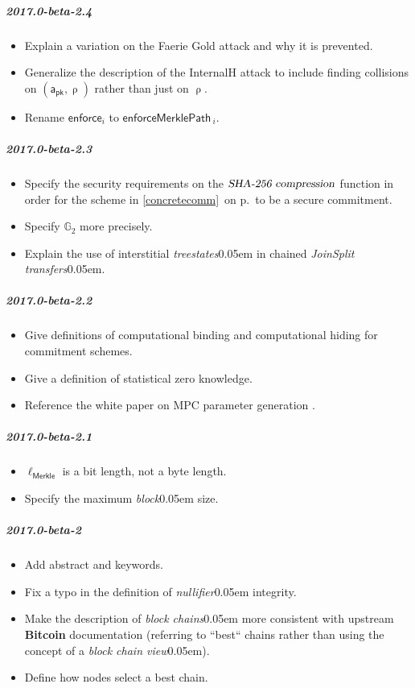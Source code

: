 \documentclass{article}
\renewcommand{\emph}[1]{\hspace{0.15em}{\fontfamily{pnc}\selectfont\scalebox{1.02}[0.999]{\textit{#1}}}\hspace{0.02em}}
\newcommand{\crossref}[1]{\autoref{#1}\, \emph{`\nameref*{#1}\kern -0.05em'} on p.\,\pageref*{#1}}
\newcommand{\introlist}{\needspace{15ex}}
\newcommand{\term}[1]{\textsl{#1}\kern 0.05em\xspace}
\newcommand{\termbf}[1]{\textbf{#1}\xspace}
\newcommand{\Bitcoin}{\termbf{Bitcoin}}
\newcommand{\joinSplitTransfers}{\term{JoinSplit transfers}}
\newcommand{\block}{\term{block}}
\newcommand{\blockchains}{\term{block chains}}
\newcommand{\treestates}{\term{treestates}}
\newcommand{\nullifier}{\term{nullifier}}
\newcommand{\SHAName}{\term{SHA-256 compression}}
\newcommand{\AuthPublic}{\mathsf{a_{pk}}}
\newcommand{\NoteAddressRand}{\mathsf{\uprho}}
\newcommand{\MerkleHashLength}{\mathsf{\ell_{Merkle}}}
\newcommand{\GroupG}[1]{\mathbb{G}_{#1}}
\newcommand{\EnforceMerklePath}[1]{\mathsf{enforceMerklePath}_{~\!\!#1}}
\begin{document}
\introlist
\subparagraph{2017.0-beta-2.4}

\begin{itemize}
    \item Explain a variation on the Faerie Gold attack and why it is prevented.
    \item Generalize the description of the InternalH attack to include finding
          collisions on $(\AuthPublic, \NoteAddressRand)$ rather than just on
          $\NoteAddressRand$.
    \item Rename $\mathsf{enforce}_i$ to $\EnforceMerklePath{i}$.
\end{itemize}

\introlist
\subparagraph{2017.0-beta-2.3}

\begin{itemize}
    \item Specify the security requirements on the $\SHAName$ function in order
          for the scheme in \crossref{concretecomm} to be a secure commitment.
    \item Specify $\GroupG{2}$ more precisely.
    \item Explain the use of interstitial \treestates in chained \joinSplitTransfers.
\end{itemize}

\introlist
\subparagraph{2017.0-beta-2.2}

\begin{itemize}
    \item Give definitions of computational binding and computational hiding
          for commitment schemes.
    \item Give a definition of statistical zero knowledge.
    \item Reference the white paper on MPC parameter generation \cite{BGG2016}.
\end{itemize}

\introlist
\subparagraph{2017.0-beta-2.1}

\begin{itemize}
    \item $\MerkleHashLength$ is a bit length, not a byte length.
    \item Specify the maximum \block size.
\end{itemize}

\introlist
\subparagraph{2017.0-beta-2}

\begin{itemize}
    \item Add abstract and keywords.
    \item Fix a typo in the definition of \nullifier integrity.
    \item Make the description of \blockchains more consistent with
          upstream \Bitcoin documentation (referring to ``best`` chains
          rather than using the concept of a \term{block chain view}).
    \item Define how nodes select a best chain.
\end{itemize}
\end{document}
